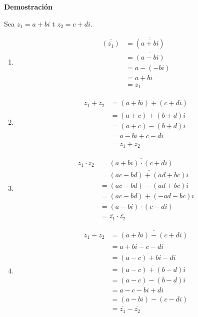 \documentclass[11pt]{article}
\begin{document}
\textbf{Demostración}

Sea $z_1=a+bi$ t $z_2=c+di$. \begin{enumerate}[label=\roman*)] 
  \item \begin{align*}
    \overline{(\overline{z_1})} &= \overline{(\overline{a+bi})}\\
    &= \overline{(a-bi)} \\
    &= a-(-bi) \\
    &= a+bi\\
    &= z_1
  \end{align*}
  
  \item \begin{align*}
    \overline{z_1+z_2}  &= \overline{(a+bi)+(c+di)}\\
    &= \overline{(a+c)+(b+d)i}\\
    &= (a+c)-(b+d)i\\
    &= a-bi+c-di \\
    &= \overline{z_1}+\overline{z_2}
  \end{align*}

  \item \begin{align*}
    \overline{z_1\cdot z_2} &= \overline{(a+bi)\cdot (c+di)} \\
    &= \overline{(ac-bd)+(ad+bc)i}\\
    &= (ac-bd)-(ad+bc)i\\
    &= (ac-bd)+(-ad-bc)i\\
    &= (a-bi)\cdot (c-di)\\
    &= \overline{z_1} \cdot \overline{z_2}
  \end{align*}

  \item \begin{align*}
    \overline{z_1-z_2} &= \overline{(a+bi)-(c+di)} \\
    &= \overline{a+bi-c-di}\\
    &= \overline{(a-c)+bi-di}\\
    &= \overline{(a-c)+(b-d)i}\\
    &= (a-c)-(b-d)i\\
    &= a-c-bi+di\\
    &= (a-bi)-(c-di)\\
    &= \overline{z_1} - \overline{z_2}
  \end{align*}

\end{enumerate}
\end{document}
